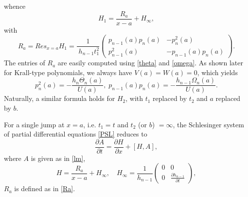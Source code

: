 \documentclass[10pt, reqno]{amsart}
\numberwithin{equation}{section}
\numberwithin{equation}{section}
\begin{document}
whence
\begin{equation}
H_1=\frac{R_a}{x-a}+H_\infty, \label{cH1}
\end{equation}
with
\begin{equation} \label{Ra}
R_a=Res_{x=a} H_1=\frac{1}{\;h_{n-1}t_1^2}\begin{pmatrix}p_{n-1}(a)p_n(a)&-p_n^2(a)\\
p_{n-1}^2(a)&-p_{n-1}(a)p_n(a)\end{pmatrix}.
\end{equation}
The entries of $R_a$ are easily computed using \eqref{theta} and \eqref{omega}. As shown later for Krall-type polynomials, we always have $V(a)=W(a)=0$, which yields
\begin{equation} \label{cRa}
p_n^2(a)=-\frac{h_n\Theta_n(a)}{U(a)},\; p_{n-1}(a)p_n(a)=-\frac{h_{n-1}\Omega_n(a)}{U(a)}.
\end{equation}
Naturally, a similar formula holds for $H_2$, with $t_1$ replaced by $t_2$ and $a$ replaced by $b$. 

For a single jump at $x=a$, i.e. $t_1=t$ and $t_2$ (or $b$) $=\infty$, the Schlesinger system of partial differential equations \eqref {PSL} reduces to 
\begin{equation} 
\frac{\partial A}{\partial t}=\frac{\partial H}{\partial x}+[H,A],\label{OSL}
\end{equation}
where $A$ is given as in \eqref{lm},
\begin{equation}
H=\frac{R_a}{x-a}+H_\infty, \quad H_\infty=\frac{1}{h_{n-1}}\begin{pmatrix} 0&0\\0&\frac{\partial h_{n-1}}{\partial t}\end{pmatrix},\label{H}
\end{equation} 
$R_a$ is defined as in \eqref{Ra}.
\end{document}
